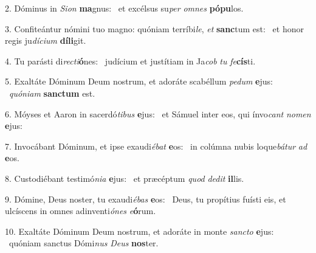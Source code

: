 2. Dóminus in \textit{Si}\textit{on} \textbf{ma}gnus: \ast\  et excélsus su\textit{per} \textit{om}\textit{nes} \textbf{pó}\textbf{pu}los.\

3. Confiteántur nómini tuo magno: quóniam terríbi\textit{le}, \textit{et} \textbf{sanc}tum est: \ast\  et honor regis ju\textit{dí}\textit{ci}\textit{um} \textbf{dí}\textbf{li}git.\

4. Tu parásti di\textit{rec}\textit{ti}\textbf{ó}nes: \ast\  judícium et justítiam in Ja\textit{cob} \textit{tu} \textit{fe}\textbf{cís}ti.\

5. Exaltáte Dóminum Deum nostrum, et adoráte scabéllum \textit{pe}\textit{dum} \textbf{e}jus: \ast\  \textit{quón}\textit{i}\textit{am} \textbf{sanc}\textbf{tum} est.\

6. Móyses et Aaron in sacerdó\textit{ti}\textit{bus} \textbf{e}jus: \ast\  et Sámuel inter eos, qui ínvo\textit{cant} \textit{no}\textit{men} \textbf{e}jus:\

7. Invocábant Dóminum, et ipse exaudi\textit{é}\textit{bat} \textbf{e}os: \ast\  in colúmna nubis loque\textit{bá}\textit{tur} \textit{ad} \textbf{e}os.\

8. Custodiébant testimó\textit{ni}\textit{a} \textbf{e}jus: \ast\  et præcéptum \textit{quod} \textit{de}\textit{dit} \textbf{il}lis.\

9. Dómine, Deus noster, tu exaudi\textit{é}\textit{bas} \textbf{e}os: \ast\  Deus, tu propítius fuísti eis, et ulcíscens in omnes adinventi\textit{ó}\textit{nes} \textit{e}\textbf{ó}rum.\

10. Exaltáte Dóminum Deum nostrum, et adoráte in monte \textit{sanc}\textit{to} \textbf{e}jus: \ast\  quóniam sanctus Dómi\textit{nus} \textit{De}\textit{us} \textbf{nos}ter.\

